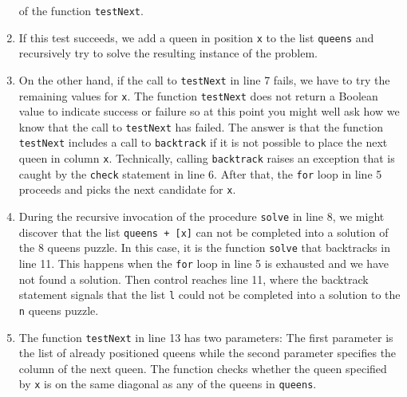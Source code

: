 \begin{enumerate}
      of the function \texttt{testNext}.
\item If this test succeeds, we add a queen in position \texttt{x} to the list \texttt{queens} and
      recursively try to solve the resulting instance of the problem.
\item On the other hand, if the call to \texttt{testNext} in line 7 fails, we have to try
      the remaining values for \texttt{x}.   The function \texttt{testNext} does not return a 
      Boolean value to indicate success or failure so at this point you might well
      ask how we know that the call to \texttt{testNext} has failed.  The answer is that the function
      \texttt{testNext} includes a call to \texttt{backtrack} if it is not possible to
      place the next queen in column \texttt{x}.  Technically, calling \texttt{backtrack}
      raises an exception that is caught by the \texttt{check} statement in line 6.
      After that,  the \texttt{for} loop in line 5 proceeds and picks the next
      candidate for \texttt{x}.
\item During the recursive invocation of the procedure \texttt{solve} in line 8, we might
      discover that the list \texttt{queens + [x]} can not be completed into a solution of the 8
      queens puzzle.   In this case, it is the function \texttt{solve} that backtracks
      in line 11.  This happens when the \texttt{for} loop in line 5 is exhausted and we
      have not found a solution.  Then
      control  reaches line 11, where the backtrack statement  signals that the list \texttt{l}
      could not be completed into a solution to the \texttt{n} queens puzzle.
\item The function \texttt{testNext} in line 13 has two parameters:  The first parameter is the list
      of already positioned queens while the second parameter specifies the column of the next
      queen.  The function checks whether the queen specified by \texttt{x} is on the same
      diagonal as any of the queens in \texttt{queens}.
      

\end{enumerate}
